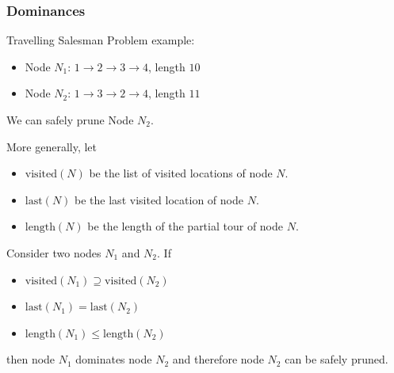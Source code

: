 \documentclass[10pt]{beamer}
\begin{document}
\begin{frame}
  \frametitle{Dominances}

  Travelling Salesman Problem example:
  \begin{itemize}
    \item Node $N_1$: $1 \to 2 \to 3 \to 4$, length $10$
    \item Node $N_2$: $1 \to 3 \to 2 \to 4$, length $11$
  \end{itemize}

  We can safely prune Node $N_2$.

  \pause

  \bigskip

  More generally, let
  \begin{itemize}
    \item $\mathrm{visited}(N)$ be the list of visited locations of node $N$.
    \item $\mathrm{last}(N)$ be the last visited location of node $N$.
    \item $\mathrm{length}(N)$ be the length of the partial tour of node $N$.
  \end{itemize}

  Consider two nodes $N_1$ and $N_2$.
  If
  \begin{itemize}
    \item $\mathrm{visited}(N_1) \supseteq \mathrm{visited}(N_2)$
    \item $\mathrm{last}(N_1) = \mathrm{last}(N_2)$
    \item $\mathrm{length}(N_1) \le \mathrm{length}(N_2)$
  \end{itemize}
  then node $N_1$ dominates node $N_2$ and therefore node $N_2$ can be safely pruned.
\end{frame}
\end{document}
